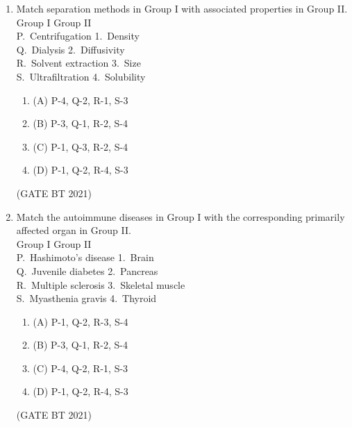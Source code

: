 \documentclass[journal,12pt,onecolumn]{IEEEtran}
\theoremstyle{remark}
\begin{document}
\begin{enumerate}
\item Match separation methods in Group I with associated properties in Group II.\\[2pt]
Group I \hspace{3.5cm} Group II\\
P.\ Centrifugation \hspace{2.2cm} 1.\ Density\\
Q.\ Dialysis \hspace{3.5cm} 2.\ Diffusivity\\
R.\ Solvent extraction \hspace{1.8cm} 3.\ Size\\
S.\ Ultrafiltration \hspace{2.7cm} 4.\ Solubility
\begin{enumerate}
\item (A) P-4, Q-2, R-1, S-3
\item (B) P-3, Q-1, R-2, S-4
\item (C) P-1, Q-3, R-2, S-4
\item (D) P-1, Q-2, R-4, S-3
\end{enumerate}
\hfill (GATE BT 2021)

\item Match the autoimmune diseases in Group I with the corresponding primarily affected organ in Group II.\\[2pt]
Group I \hspace{3.5cm} Group II\\
P.\ Hashimoto's disease \hspace{2.0cm} 1.\ Brain\\
Q.\ Juvenile diabetes \hspace{2.7cm} 2.\ Pancreas\\
R.\ Multiple sclerosis \hspace{2.6cm} 3.\ Skeletal muscle\\
S.\ Myasthenia gravis \hspace{2.7cm} 4.\ Thyroid
\begin{enumerate}
\item (A) P-1, Q-2, R-3, S-4
\item (B) P-3, Q-1, R-2, S-4
\item (C) P-4, Q-2, R-1, S-3
\item (D) P-1, Q-2, R-4, S-3
\end{enumerate}
\hfill (GATE BT 2021)


\end{enumerate}
\end{document}
